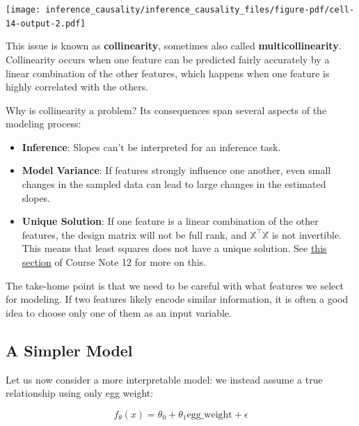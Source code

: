 \documentclass[
  letterpaper,
  DIV=11,
  numbers=noendperiod]{scrreprt}
\providecommand{\tightlist}{%
  \setlength{\itemsep}{0pt}\setlength{\parskip}{0pt}}\usepackage{longtable,booktabs,array}
\begin{document}
\texttt{[image: inference\_causality/inference\_causality\_files/figure-pdf/cell-14-output-2.pdf]}

This issue is known as \textbf{collinearity}, sometimes also called
\textbf{multicollinearity}. Collinearity occurs when one feature can be
predicted fairly accurately by a linear combination of the other
features, which happens when one feature is highly correlated with the
others.

Why is collinearity a problem? Its consequences span several aspects of
the modeling process:

\begin{itemize}
\tightlist
\item
  \textbf{Inference}: Slopes can't be interpreted for an inference task.
\item
  \textbf{Model Variance}: If features strongly influence one another,
  even small changes in the sampled data can lead to large changes in
  the estimated slopes.
\item
  \textbf{Unique Solution}: If one feature is a linear combination of
  the other features, the design matrix will not be full rank, and
  \(\mathbb{X}^{\top}\mathbb{X}\) is not invertible. This means that
  least squares does not have a unique solution. See
  \href{https://ds100.org/course-notes/ols/ols.html\#uniqueness-of-the-ols-solution}{this
  section} of Course Note 12 for more on this.
\end{itemize}

The take-home point is that we need to be careful with what features we
select for modeling. If two features likely encode similar information,
it is often a good idea to choose only one of them as an input variable.

\subsection{A Simpler Model}\label{a-simpler-model}

Let us now consider a more interpretable model: we instead assume a true
relationship using only egg weight:

\[f_\theta(x) = \theta_0 + \theta_1 \text{egg\_weight} + \epsilon\]
\end{document}

